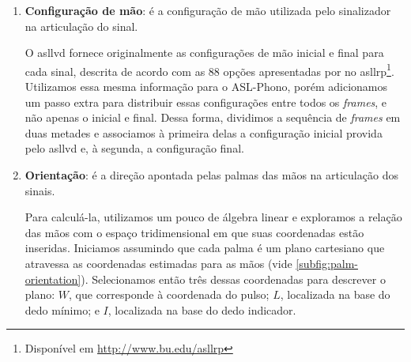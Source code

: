 \begin{enumerate}
    \item \textbf{Configuração de mão}: é a configuração de mão utilizada pelo sinalizador na articulação do sinal.

          O \acrshort{asllvd} fornece originalmente as configurações de mão inicial e final para cada sinal, descrita de acordo com as 88 opções apresentadas por  no \acrfull{asllrp}\footnote{
              Disponível em \url{http://www.bu.edu/asllrp}
          }.
          Utilizamos essa mesma informação para o ASL-Phono, porém adicionamos um passo extra para distribuir essas configurações entre todos os \textit{frames}, e não apenas o inicial e final.
          Dessa forma, dividimos a sequência de \textit{frames} em duas metades e associamos à primeira delas a configuração inicial provida pelo \acrshort{asllvd} e, à segunda, a configuração final.

    \item \textbf{Orientação}: é a direção apontada pelas palmas das mãos na articulação dos sinais.

          Para calculá-la, utilizamos um pouco de álgebra linear e exploramos a relação das mãos com o espaço tridimensional em que suas coordenadas estão inseridas.
          Iniciamos assumindo que cada palma é um plano cartesiano que atravessa as coordenadas estimadas para as mãos (vide \autoref{subfig:palm-orientation}). Selecionamos então três dessas coordenadas para descrever o plano: \(W\), que corresponde à coordenada do pulso; \(L\), localizada na base do dedo mínimo; e \(I\), localizada na base do dedo indicador.


\end{enumerate}
